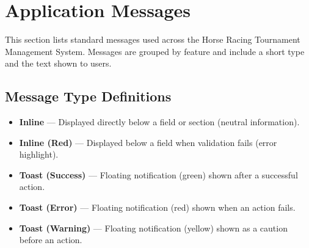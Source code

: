 \section{Application Messages}

This section lists standard messages used across the Horse Racing Tournament
Management System. Messages are grouped by feature and include a short type
and the text shown to users.

\subsection{Message Type Definitions}
\begin{itemize}
  \item \textbf{Inline} --- Displayed directly below a field or section (neutral information).
  \item \textbf{Inline (Red)} --- Displayed below a field when validation fails (error highlight).
  \item \textbf{Toast (Success)} --- Floating notification (green) shown after a successful action.
  \item \textbf{Toast (Error)} --- Floating notification (red) shown when an action fails.
  \item \textbf{Toast (Warning)} --- Floating notification (yellow) shown as a caution before an action.
\end{itemize}

